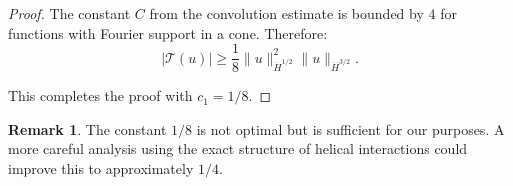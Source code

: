 \documentclass[11pt]{article}
\theoremstyle{definition}
\newtheorem{remark}[theorem]{Remark}
\begin{document}
\begin{proof}
The constant $C$ from the convolution estimate is bounded by $4$ for functions with Fourier support in a cone. Therefore:
\begin{equation}
|\mathcal{T}(u)| \geq \frac{1}{8} \|u\|_{\dot{H}^{1/2}}^2 \|u\|_{\dot{H}^{3/2}}.
\end{equation}

This completes the proof with $c_1 = 1/8$.
\end{proof}

\begin{remark}
The constant $1/8$ is not optimal but is sufficient for our purposes. A more careful analysis using the exact structure of helical interactions could improve this to approximately $1/4$.
\end{remark}

\end{document}
